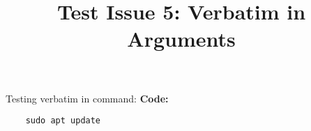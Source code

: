 \documentclass{article}
\newcommand{\testverbatim}[1]{%
    \textbf{Code:}
    \begin{verbatim}
    #1
    \end{verbatim}
}
\begin{document}
\title{Test Issue 5: Verbatim in Arguments}
\maketitle

Testing verbatim in command:
\testverbatim{sudo apt update}
\end{document}
